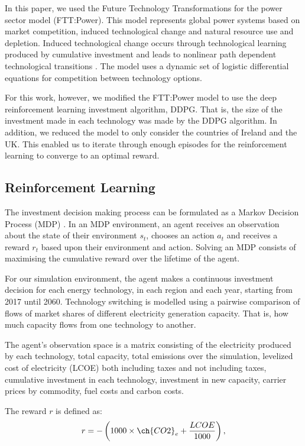 \documentclass{article}
\begin{document}
In this paper, we used the Future Technology Transformations for the power sector  model (FTT:Power). This model represents global power systems based on market competition, induced technological change and natural resource use and depletion. Induced technological change occurs through technological learning produced by cumulative investment and leads to nonlinear path dependent technological transitions \cite{Mercure2012}. The model uses a dynamic set of logistic differential equations for competition between technology options.

For this work, however, we modified the FTT:Power model to use the deep reinforcement learning investment algorithm, DDPG. That is, the size of the investment made in each technology was made by the DDPG algorithm. In addition, we reduced the model to only consider the countries of Ireland and the UK. This enabled us to iterate through enough episodes for the reinforcement learning to converge to an optimal reward.

\subsection*{Reinforcement Learning}

The investment decision making process can be formulated as a Markov Decision Process (MDP) \cite{puterman2014markov}. In an MDP environment, an agent receives an observation about the state of their environment $s_t$, chooses an action $a_t$ and receives a reward $r_t$ based upon their environment and action. Solving an MDP consists of maximising the cumulative reward over the lifetime of the agent. 


For our simulation environment, the agent makes a continuous investment decision for each energy technology, in each region and each year, starting from 2017 until 2060. 	Technology switching is modelled using a pairwise comparison of flows of market shares of different electricity generation capacity. That is, how much capacity flows from one technology to another. 

The agent's observation space is a matrix consisting of the electricity produced by each technology, total capacity, total  emissions over the simulation, levelized cost of electricity (LCOE) both including taxes and not including taxes, cumulative investment in each technology, investment in new capacity, carrier prices by commodity, fuel costs and carbon costs.

The reward $r$ is defined as:
\begin{equation}
	r = -\left(1000\times\ch{CO2}_e + \frac{LCOE}{1000}\right),
\end{equation}
\end{document}
